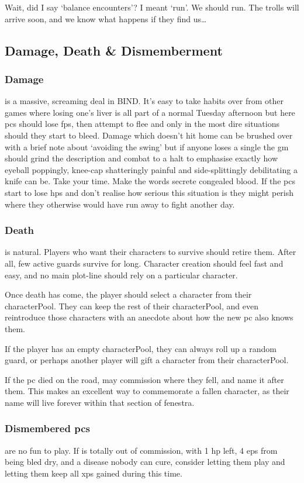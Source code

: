 \begin{multicols}{2}
Wait, did I say `balance encounters'?
I meant `run'.
We should run.
The trolls will arrive soon, and we know what happens if they find us\ldots

\subsection{Damage, Death \& Dismemberment}

\subsubsection{Damage}
is a massive, screaming deal in BIND.
It's easy to take habits over from other games where losing one's liver is all part of a normal Tuesday afternoon but here \glspl{pc} should lose \glspl{fp}, then attempt to flee and only in the most dire situations should they start to bleed.
Damage which doesn't hit home can be brushed over with a brief note about `avoiding the swing' but if anyone loses a single  the \gls{gm} should grind the description and combat to a halt to emphasise exactly how eyeball poppingly, knee-cap shatteringly painful and side-splittingly debilitating a knife can be.
Take your time.
Make the words secrete congealed blood.
If the \glspl{pc} start to lose \glspl{hp} and don't realise how serious this situation is they might perish where they otherwise would have run away to fight another day.

\subsubsection{Death}
\label{pcdeath}
is natural.
Players who want their characters to survive should retire them.
After all, few active \glspl{guard} survive for long.
Character creation should feel fast and easy, and no main plot-line should rely on a particular character.

Once death has come, the player should select a character from their \gls{characterPool}.
They can keep the rest of their \gls{characterPool}, and even reintroduce those characters with an anecdote about how the new \gls{pc} also knows them.

If the player has an empty \gls{characterPool}, they can always roll up a random \gls{guard}, or perhaps another player will gift a character from their \gls{characterPool}.

If the \gls{pc} died on the road,  may commission  where they fell, and name it after them.
This makes an excellent way to commemorate a fallen character, as their name will live forever within that section of \gls{fenestra}.

\subsubsection{Dismembered \Glspl{pc}}
are no fun to play.
If  is totally out of commission, with 1 \gls{hp} left, 4 \glspl{ep} from being bled dry, and a disease nobody can cure, consider letting them play  and letting them keep all \glspl{xp} gained during this time.

\end{multicols}

